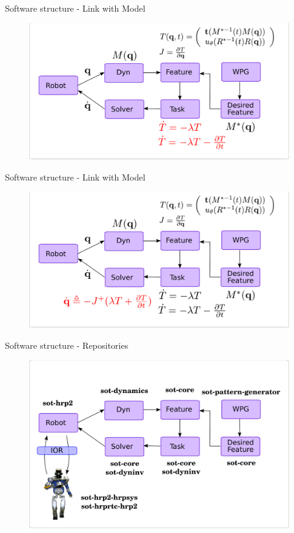 \begin{frame}{Software structure - Link with Model}
  \begin{figure}
    \includegraphics[width=\linewidth]{./figures/Concept-Theory-Fig-Finalv2M1}
  \end{figure}
\end{frame}

\begin{frame}{Software structure - Link with Model}
  \begin{figure}
    \includegraphics[width=\linewidth]{./figures/Concept-Theory-Fig-Finalv2}
  \end{figure}
\end{frame}

\begin{frame}{Software structure - Repositories}
  \begin{figure}
    \includegraphics[width=\linewidth]{./figures/Concept-Software-Fig}
  \end{figure}
\end{frame}

